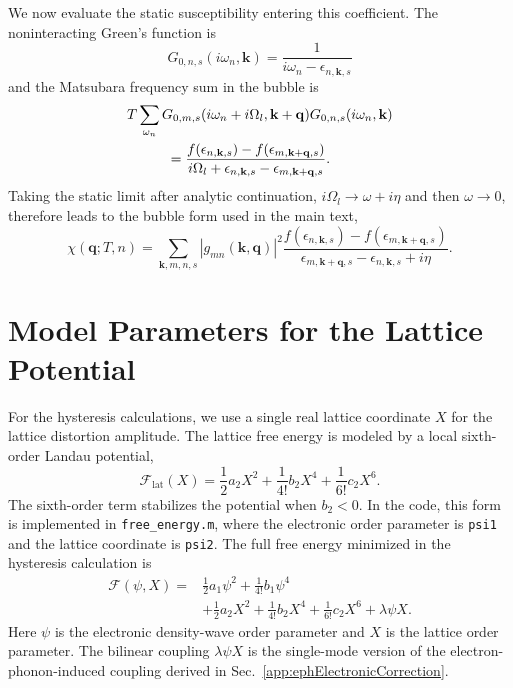 \documentclass[aps,prl,article,twocolumn,preprintnumbers,amsmath,amssymb,superscriptaddress]{revtex4-2}
\begin{document}
We now evaluate the static susceptibility entering this coefficient.
The noninteracting Green's function is
\begin{equation}
G_{0,n,s}(i\omega_n,\mathbf k)
=
\frac{1}{i\omega_n-\epsilon_{n,\mathbf k,s}}
\end{equation}
and the Matsubara frequency sum in the bubble is
\begin{align}
&T
\sum_{\omega_n}
G_{0,m,s}(i\omega_n+i\Omega_l,\mathbf k+\mathbf q)
G_{0,n,s}(i\omega_n,\mathbf k)
\nonumber\\
&\hspace{1.0cm}
=
\frac{
f(\epsilon_{n,\mathbf k,s})
-
f(\epsilon_{m,\mathbf k+\mathbf q,s})
}{
i\Omega_l
+
\epsilon_{n,\mathbf k,s}
-
\epsilon_{m,\mathbf k+\mathbf q,s}
}.
\end{align}
Taking the static limit after analytic continuation,
$i\Omega_l\rightarrow \omega+i\eta$ and then $\omega\rightarrow 0$,
therefore leads to the bubble form used in the main text,
\begin{equation}
\chi(\mathbf q;T,n)
=
\sum_{\mathbf k,m,n,s}
\left|
g_{mn}(\mathbf k,\mathbf q)
\right|^2
\frac{
f(\epsilon_{n,\mathbf k,s})
-
f(\epsilon_{m,\mathbf k+\mathbf q,s})
}{
\epsilon_{m,\mathbf k+\mathbf q,s}
-
\epsilon_{n,\mathbf k,s}
+
i\eta
}.
\end{equation}

\section{Model Parameters for the Lattice Potential}\label{app:latticePotential}

For the hysteresis calculations, we use a single real lattice coordinate
$X$ for the lattice distortion amplitude.  The lattice free energy is
modeled by a local sixth-order Landau potential,
\begin{equation}
\label{eq:siLatticePotential}
\mathcal F_{\mathrm{lat}}(X)
=
\frac{1}{2}a_2 X^2
+
\frac{1}{4!}b_2 X^4
+
\frac{1}{6!}c_2 X^6 .
\end{equation}
The sixth-order term stabilizes the potential when $b_2<0$.  In the
code, this form is implemented in \texttt{free\_energy.m}, where the
electronic order parameter is \texttt{psi1} and the lattice coordinate
is \texttt{psi2}.  The full free energy minimized in the hysteresis
calculation is
\begin{align}
\label{eq:siNumericalFreeEnergy}
\mathcal F(\psi,X)
=&
\frac{1}{2}a_1\psi^2
+
\frac{1}{4!}b_1\psi^4
\nonumber\\
&+
\frac{1}{2}a_2 X^2
+
\frac{1}{4!}b_2 X^4
+
\frac{1}{6!}c_2 X^6
+
\lambda \psi X .
\end{align}
Here $\psi$ is the electronic density-wave order parameter and $X$ is
the lattice order parameter.  The bilinear coupling $\lambda\psi X$ is
the single-mode version of the electron-phonon-induced coupling derived
in Sec.~\ref{app:ephElectronicCorrection}.
\end{document}
